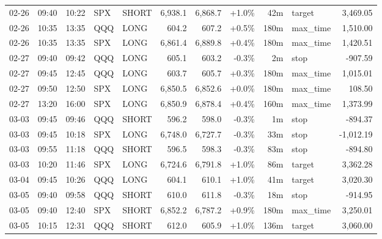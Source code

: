 \documentclass[11pt,a4paper,twoside]{article}
\begin{document}
\begin{center}
\begin{longtable}{>{\color{txtmain}}l l l l l r r r r >{\color{txtmain}}l r}
02-26 & 09:40 & 10:22 & SPX & SHORT & 6,938.1 & 6,868.7 & \textcolor{wingreen}{+1.0\%} & 42m & target & \textcolor{wingreen}{3,469.05} \\
02-26 & 10:35 & 13:35 & QQQ & LONG & 604.2 & 607.2 & \textcolor{wingreen}{+0.5\%} & 180m & max\_time & \textcolor{wingreen}{1,510.00} \\
02-26 & 10:35 & 13:35 & SPX & LONG & 6,861.4 & 6,889.8 & \textcolor{wingreen}{+0.4\%} & 180m & max\_time & \textcolor{wingreen}{1,420.51} \\
02-27 & 09:40 & 09:42 & QQQ & LONG & 605.1 & 603.2 & \textcolor{lossred}{-0.3\%} & 2m & stop & \textcolor{lossred}{-907.59} \\
02-27 & 09:45 & 12:45 & QQQ & LONG & 603.7 & 605.7 & \textcolor{wingreen}{+0.3\%} & 180m & max\_time & \textcolor{wingreen}{1,015.01} \\
02-27 & 09:50 & 12:50 & SPX & LONG & 6,850.5 & 6,852.6 & \textcolor{wingreen}{+0.0\%} & 180m & max\_time & \textcolor{wingreen}{108.50} \\
02-27 & 13:20 & 16:00 & SPX & LONG & 6,850.9 & 6,878.4 & \textcolor{wingreen}{+0.4\%} & 160m & max\_time & \textcolor{wingreen}{1,373.99} \\
03-03 & 09:45 & 09:46 & QQQ & SHORT & 596.2 & 598.0 & \textcolor{lossred}{-0.3\%} & 1m & stop & \textcolor{lossred}{-894.37} \\
03-03 & 09:45 & 10:18 & SPX & LONG & 6,748.0 & 6,727.7 & \textcolor{lossred}{-0.3\%} & 33m & stop & \textcolor{lossred}{-1,012.19} \\
03-03 & 09:55 & 11:18 & QQQ & SHORT & 596.5 & 598.3 & \textcolor{lossred}{-0.3\%} & 83m & stop & \textcolor{lossred}{-894.80} \\
03-03 & 10:20 & 11:46 & SPX & LONG & 6,724.6 & 6,791.8 & \textcolor{wingreen}{+1.0\%} & 86m & target & \textcolor{wingreen}{3,362.28} \\
03-04 & 09:45 & 10:26 & QQQ & LONG & 604.1 & 610.1 & \textcolor{wingreen}{+1.0\%} & 41m & target & \textcolor{wingreen}{3,020.30} \\
03-05 & 09:40 & 09:58 & QQQ & SHORT & 610.0 & 611.8 & \textcolor{lossred}{-0.3\%} & 18m & stop & \textcolor{lossred}{-914.95} \\
03-05 & 09:40 & 12:40 & SPX & SHORT & 6,852.2 & 6,787.2 & \textcolor{wingreen}{+0.9\%} & 180m & max\_time & \textcolor{wingreen}{3,250.01} \\
03-05 & 10:15 & 12:31 & QQQ & SHORT & 612.0 & 605.9 & \textcolor{wingreen}{+1.0\%} & 136m & target & \textcolor{wingreen}{3,060.00} \\

\end{longtable}
\end{center}
\end{document}
